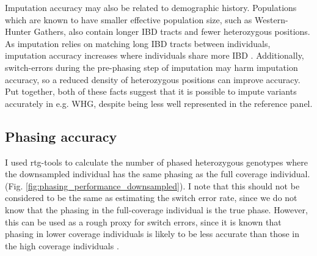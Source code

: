 Imputation accuracy may also be related to demographic history. Populations which are known to have smaller effective population size, such as Western-Hunter Gathers, also contain longer IBD tracts and fewer heterozygous positions. As imputation relies on matching long IBD tracts between individuals, imputation accuracy increases where individuals share more IBD \cite{kong2008detection}. Additionally, switch-errors during the pre-phasing step of imputation may harm imputation accuracy, so a reduced density of heterozygous positions can improve accuracy. Put together, both of these facts suggest that it is possible to impute variants accurately in e.g. WHG, despite being less well represented in the reference panel.  

\subsection{Phasing accuracy}

I used rtg-tools to calculate the number of phased heterozygous genotypes where the downsampled individual has the same phasing as the full coverage individual. (Fig.  \ref{fig:phasing_performance_downsampled}). I note that this should not be considered to be the same as estimating the switch error rate, since we do not know that the phasing in the full-coverage individual is the true phase. However, this can be used as a rough proxy for switch errors, since it is known that phasing in lower coverage individuals is likely to be less accurate than those in the high coverage individuals \cite{rubinacci2021efficient}.

